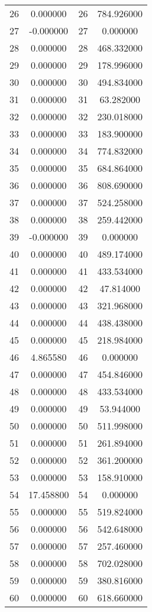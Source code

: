 \documentclass[12pt]{article}
\begin{document}
\begin{longtable}{@{}cccc@{}}
26 & 0.000000 & 26 & 784.926000 \\
27 & -0.000000 & 27 & 0.000000 \\
28 & 0.000000 & 28 & 468.332000 \\
29 & 0.000000 & 29 & 178.996000 \\
30 & 0.000000 & 30 & 494.834000 \\
31 & 0.000000 & 31 & 63.282000 \\
32 & 0.000000 & 32 & 230.018000 \\
33 & 0.000000 & 33 & 183.900000 \\
34 & 0.000000 & 34 & 774.832000 \\
35 & 0.000000 & 35 & 684.864000 \\
36 & 0.000000 & 36 & 808.690000 \\
37 & 0.000000 & 37 & 524.258000 \\
38 & 0.000000 & 38 & 259.442000 \\
39 & -0.000000 & 39 & 0.000000 \\
40 & 0.000000 & 40 & 489.174000 \\
41 & 0.000000 & 41 & 433.534000 \\
42 & 0.000000 & 42 & 47.814000 \\
43 & 0.000000 & 43 & 321.968000 \\
44 & 0.000000 & 44 & 438.438000 \\
45 & 0.000000 & 45 & 218.984000 \\
46 & 4.865580 & 46 & 0.000000 \\
47 & 0.000000 & 47 & 454.846000 \\
48 & 0.000000 & 48 & 433.534000 \\
49 & 0.000000 & 49 & 53.944000 \\
50 & 0.000000 & 50 & 511.998000 \\
51 & 0.000000 & 51 & 261.894000 \\
52 & 0.000000 & 52 & 361.200000 \\
53 & 0.000000 & 53 & 158.910000 \\
54 & 17.458800 & 54 & 0.000000 \\
55 & 0.000000 & 55 & 519.824000 \\
56 & 0.000000 & 56 & 542.648000 \\
57 & 0.000000 & 57 & 257.460000 \\
58 & 0.000000 & 58 & 702.028000 \\
59 & 0.000000 & 59 & 380.816000 \\
60 & 0.000000 & 60 & 618.660000 \\

\end{longtable}
\end{document}
